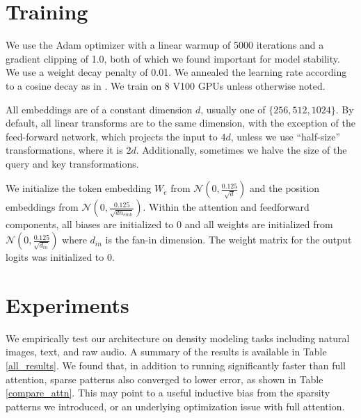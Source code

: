 \documentclass{article}
\begin{document}
\section{Training}
We use the Adam optimizer with a linear warmup of 5000 iterations and a gradient clipping of 1.0, both of which we found important for model stability. We use a weight decay penalty of 0.01. We annealed the learning rate according to a cosine decay as in \cite{radford2018}. We train on 8 V100 GPUs unless otherwise noted.

All embeddings are of a constant dimension $d$, usually one of $\{256, 512, 1024\}$. By default, all linear transforms are to the same dimension, with the exception of the feed-forward network, which projects the input to $4d$, unless we use ``half-size'' transformations, where it is $2d$. Additionally, sometimes we halve the size of the query and key transformations.

We initialize the token embedding $W_e$ from $\mathcal{N}(0, \frac{0.125}{\sqrt{d}})$ and the position embeddings from $\mathcal{N}(0, \frac{0.125}{\sqrt{dn_{emb}}})$. Within the attention and feedforward components, all biases are initialized to 0 and all weights are initialized from $\mathcal{N}(0, \frac{0.125}{\sqrt{d_{in}}})$ where $d_{in}$ is the fan-in dimension. The weight matrix for the output logits was initialized to 0.


\section{Experiments}
We empirically test our architecture on density modeling tasks including natural images, text, and raw audio. A summary of the results is available in Table \ref{all_results}. We found that, in addition to running significantly faster than full attention, sparse patterns also converged to lower error, as shown in Table \ref{compare_attn}. This may point to a useful inductive bias from the sparsity patterns we introduced, or an underlying optimization issue with full attention.
\end{document}
